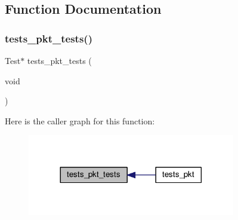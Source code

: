 \subsection{Function Documentation}
\mbox{\label{tests-pkt_8c_a5274bb49e057a0ed117b4deedd9a3f65}} 
\subsubsection{\texorpdfstring{tests\+\_\+pkt\+\_\+tests()}{tests\_pkt\_tests()}}
{\footnotesize\ttfamily Test$\ast$ tests\+\_\+pkt\+\_\+tests (\begin{DoxyParamCaption}\item[{void}]{ }\end{DoxyParamCaption})}

Here is the caller graph for this function\+:
\nopagebreak
\begin{figure}[H]
\begin{center}
\leavevmode
\includegraphics[width=257pt]{tests-pkt_8c_a5274bb49e057a0ed117b4deedd9a3f65_icgraph}
\end{center}
\end{figure}
